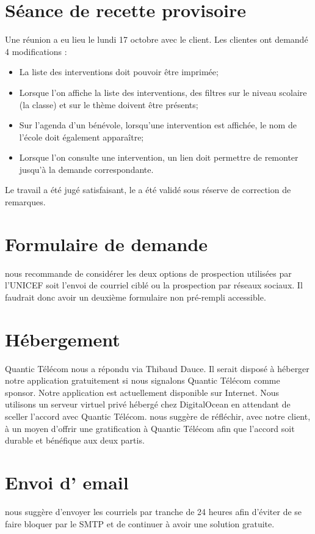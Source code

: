 \documentclass [a4paper] {article}
\begin{document}
\section{Séance de recette provisoire}
Une réunion a eu lieu le lundi 17 octobre avec le client. Les clientes ont demandé 4 modifications : 
\begin{itemize}
	\item	La liste des interventions doit pouvoir être imprimée;
	\item	Lorsque l'on affiche la liste des interventions, des filtres sur le niveau scolaire (la classe) et sur le thème doivent être présents;
	\item	Sur l'agenda d'un bénévole, lorsqu'une intervention est affichée, le nom de l'école doit également apparaître;
	\item	Lorsque l'on consulte une intervention, un lien doit permettre de remonter jusqu'à la demande correspondante.
\end{itemize} 
Le travail a été jugé satisfaisant, le \CDR{} a été validé sous réserve de correction de remarques.

\section{Formulaire de demande}
\nomTuteurPedago{} nous recommande de considérer les deux options de prospection utilisées par l'UNICEF soit l'envoi de courriel ciblé ou la prospection par réseaux sociaux. 
Il faudrait donc avoir un deuxième formulaire non pré-rempli accessible.

\section{Hébergement}
Quantic Télécom nous a répondu via Thibaud Dauce. Il serait disposé à héberger notre application gratuitement si nous signalons Quantic Télécom comme sponsor. Notre application est actuellement disponible sur Internet. Nous utilisons un serveur virtuel privé hébergé chez DigitalOcean en attendant de sceller l'accord avec Quantic Télécom. \nomTuteurPedago{} nous suggère de réfléchir, avec notre client, à un moyen d'offrir une gratification à Quantic Télécom afin que l'accord soit durable et bénéfique aux deux partis.

\section{Envoi d' email}
\nomTuteurPedago{} nous suggère d'envoyer les courriels par tranche de 24 heures afin d'éviter de se faire bloquer par le SMTP et de continuer à avoir une solution gratuite.
\newpage
\end{document}
